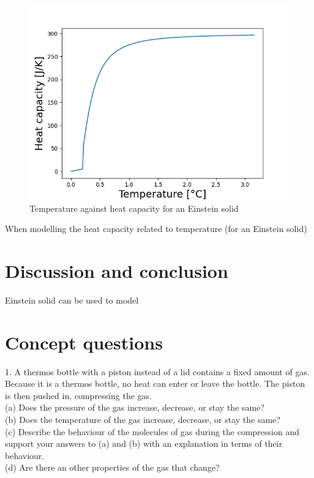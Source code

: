 \documentclass[reprint,english,notitlepage]{revtex4-2}
\begin{document}
\begin{figure}[h]
  \includegraphics[scale=0.5]{T_mot_cv.png}
  \caption{Temperature against heat capacity for an Einstein solid}\label{fig: tagainstcv}
\end{figure}
When modelling the heat capacity related to temperature (for an Einstein solid)

\section{Discussion and conclusion}
Einstein solid can be used to model

\newpage
\appendix
\section{Concept questions}
1. A thermos bottle with a piston instead of a lid contains a fixed amount of gas. Because it is a thermos
bottle, no heat can enter or leave the bottle. The
piston is then pushed in, compressing the gas. \\
(a) Does the pressure of the gas increase, decrease,
or stay the same?\\
(b) Does the temperature of the gas increase, decrease, or stay the same?\\
(c) Describe the behaviour of the molecules of gas
during the compression and support your answers to (a) and (b) with an explanation in
terms of their behaviour. \\
(d) Are there an other properties of the gas that
change?\\
\end{document}
